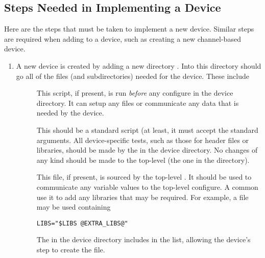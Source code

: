 \subsection{Steps Needed in Implementing a Device}
Here are the steps that must be taken to implement a new device.
Similar steps are required when adding to a device, such as creating a
new channel-based device.

\begin{enumerate}
\item A new device is created by adding a new directory
.  Into this directory should go all of the
files (and subdirectories) needed for the device.  These include
\begin{description}
\item[]This script, if present, is run
\emph{before} any configure in the device directory.  It can setup any
files or communicate any data that is needed by the device.

\item[]This should be a standard 
script (at least, it must accept the standard 
arguments.  All device-specific tests, such as those for header files
or libraries, should be made by the  in the device
directory.  No changes of any kind should be made to the top-level
 (the one in the  directory).

\item[]This file, if present, is sourced by the
top-level .  It should be used to communicate any
variable values to the top-level configure.  A common use it to add
any libraries that may be required.  For example, a file
 may be used containing
\begin{verbatim}
LIBS="$LIBS @EXTRA_LIBS@"
\end{verbatim}
The  in the device directory includes 
in the  list, allowing the device's  step to
create the  file.
\end{description}


\end{enumerate}
